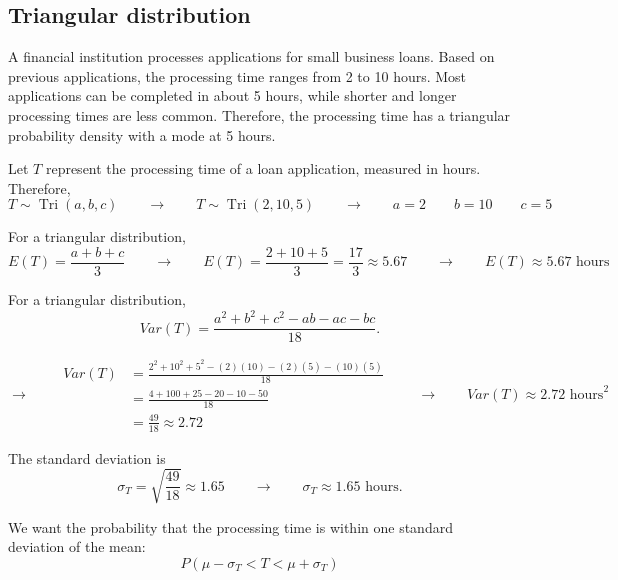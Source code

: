 \subsection{Triangular distribution}\label{sec:c4-problem-triangular}


A financial institution processes applications for small business loans.
Based on previous applications, the processing time ranges from 2 to
10 hours. Most applications can be completed in about 5 hours, while
shorter and longer processing times are less common. Therefore, the
processing time has a triangular probability density with a mode at
5 hours.

Let $T$ represent the processing time of a loan application, measured in
hours. Therefore,
\[
T\sim\operatorname{Tri}(a,b,c)
\qquad \longrightarrow \qquad
T\sim\operatorname{Tri}(2,10,5)
\qquad \longrightarrow \qquad
a=2\qquad b=10\qquad c=5
\]



For a triangular distribution,
\[
E(T)=\frac{a+b+c}{3}
\qquad \longrightarrow \qquad
E(T)
=\frac{2+10+5}{3}
=\frac{17}{3}
\approx5.67
\qquad \longrightarrow \qquad
\boxed{E(T)\approx5.67\text{ hours}}
\]


For a triangular distribution,
\[
Var(T)
=
\frac{a^2+b^2+c^2-ab-ac-bc}{18}.
\]

\[
\longrightarrow \qquad
\begin{aligned}
	Var(T)
	&=
	\frac{
		2^2+10^2+5^2
		-(2)(10)
		-(2)(5)
		-(10)(5)
	}{18}
	\\
	&=
	\frac{4+100+25-20-10-50}{18}
	\\
	&=
	\frac{49}{18}
	\approx2.72
\end{aligned}
\qquad \longrightarrow \qquad
\boxed{Var(T)\approx2.72\text{ hours}^2}
\]


The standard deviation is
\[
\sigma_T=\sqrt{\frac{49}{18}}
\approx1.65
\qquad \longrightarrow \qquad
\boxed{\sigma_T\approx1.65\text{ hours}}.
\]


We want the probability that the processing time is within one standard
deviation of the mean:
\[
P(\mu-\sigma_T<T<\mu+\sigma_T)
\]

